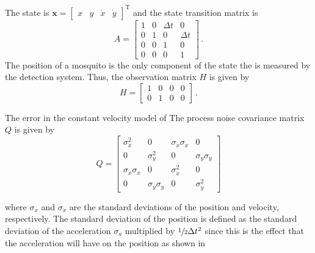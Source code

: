 The state is $\mathbf{x} = \begin{bmatrix} x & y & \dot{x} & \dot{y} \end{bmatrix}^\mathrm{T}$ and the state transition matrix is
\begin{equation}
    \label{eq:kalman_filter_state_transition_matrix}
    A = \begin{bmatrix}
        1 & 0 & \Delta t & 0        \\
        0 & 1 & 0        & \Delta t \\
        0 & 0 & 1        & 0        \\
        0 & 0 & 0        & 1
    \end{bmatrix}\,.
\end{equation}
The position of a mosquito is the only component of the state the is measured by the detection system. Thus, the observation matrix $H$ is given by
\begin{equation}
    \label{eq:kalman_filter_observation_matrix}
    H = \begin{bmatrix}
        1 & 0 & 0 & 0 \\
        0 & 1 & 0 & 0
    \end{bmatrix}\,.
\end{equation}

The error in the constant velocity model of The process noise covariance matrix $Q$ is given by
\begin{equation}
    Q = \begin{bmatrix}
        \sigma_{x}^2               & 0                          & \sigma_{x}\sigma_{\dot{x}} & 0                          \\
        0                          & \sigma_{y}^2               & 0                          & \sigma_{y}\sigma_{\dot{y}} \\
        \sigma_{\dot{x}}\sigma_{x} & 0                          & \sigma_{\dot{x}}^2         & 0                          \\
        0                          & \sigma_{\dot{y}}\sigma_{y} & 0                          & \sigma_{\dot{y}}^2
    \end{bmatrix}
    \label{eq:kalman_filter_process_noise_covariance_matrix}
\end{equation}

where $\sigma_{x}$ and $\sigma_{\dot{x}}$ are the standard deviations of the position and velocity, respectively. The standard deviation of the position is defined as the standard deviation of the acceleration $\sigma_a$ multiplied by $\sfrac{1}{2}\Delta t^2$ since this is the effect that the acceleration will have on the position as shown in


